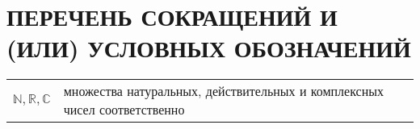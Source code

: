 \chapter*{\MakeUppercase{Перечень сокращений и (или) условных обозначений}}

\begin{longtable}{p{}p{}}
$\mathbb{N}, \mathbb{R}, \mathbb{C}$ & множества натуральных, действительных и 
комплексных чисел соответственно\\
\end{longtable}

\newpage

